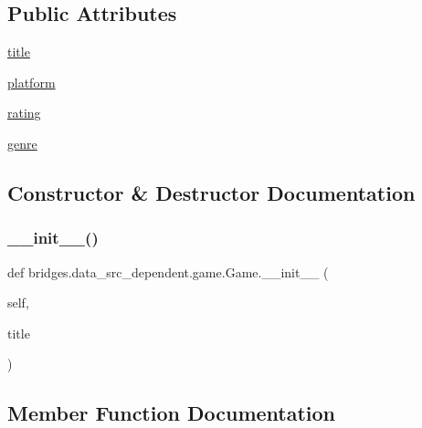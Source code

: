 \subsection*{Public Attributes}
\begin{DoxyCompactItemize}
\item 
\mbox{\hyperlink{classbridges_1_1data__src__dependent_1_1game_1_1_game_aed1f4f6133e9638c6919badd5628a6e5}{title}}
\item 
\mbox{\hyperlink{classbridges_1_1data__src__dependent_1_1game_1_1_game_aee5c30d2e5a1230b082a8e1bbfc5e52d}{platform}}
\item 
\mbox{\hyperlink{classbridges_1_1data__src__dependent_1_1game_1_1_game_a7c9febad3d81e1c212fcc94412edc0aa}{rating}}
\item 
\mbox{\hyperlink{classbridges_1_1data__src__dependent_1_1game_1_1_game_a1885fb374c987fae3500f1b1eac19997}{genre}}
\end{DoxyCompactItemize}


\subsection{Constructor \& Destructor Documentation}
\mbox{\label{classbridges_1_1data__src__dependent_1_1game_1_1_game_aeeaed2287f616f6ec9ff8c2bd6f07835}} 
\subsubsection{\texorpdfstring{\+\_\+\+\_\+init\+\_\+\+\_\+()}{\_\_init\_\_()}}
{\footnotesize\ttfamily def bridges.\+data\+\_\+src\+\_\+dependent.\+game.\+Game.\+\_\+\+\_\+init\+\_\+\+\_\+ (\begin{DoxyParamCaption}\item[{}]{self,  }\item[{}]{title }\end{DoxyParamCaption})}



\subsection{Member Function Documentation}
\mbox{\label{classbridges_1_1data__src__dependent_1_1game_1_1_game_a4f9e6fb999910d12f6bf195230e1f6aa}} 
